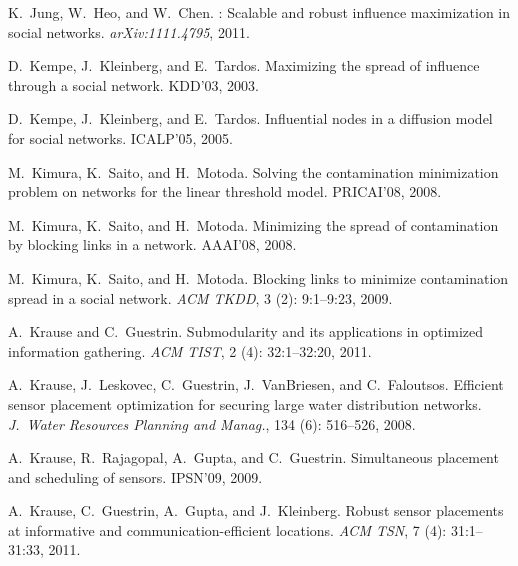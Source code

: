 \begin{thebibliography}{41}
K.~Jung, W.~Heo, and W.~Chen.
: Scalable and robust influence maximization in social
  networks.
\newblock \emph{arXiv:1111.4795}, 2011.

D.~Kempe, J.~Kleinberg, and E.~Tardos.
\newblock Maximizing the spread of influence through a social network.
\newblock KDD'03, 2003.

D.~Kempe, J.~Kleinberg, and E.~Tardos.
\newblock Influential nodes in a diffusion model for social networks.
\newblock ICALP'05, 2005.

M.~Kimura, K.~Saito, and H.~Motoda.
\newblock Solving the contamination minimization problem on networks for the
  linear threshold model.
\newblock PRICAI'08, 2008.

M.~Kimura, K.~Saito, and H.~Motoda.
\newblock Minimizing the spread of contamination by blocking links in a
  network.
\newblock AAAI'08, 2008.

M.~Kimura, K.~Saito, and H.~Motoda.
\newblock Blocking links to minimize contamination spread in a social network.
\newblock \emph{ACM TKDD}, 3 (2): 9:1--9:23, 2009.

A.~Krause and C.~Guestrin.
\newblock Submodularity and its applications in optimized information
  gathering.
\newblock \emph{ACM TIST}, 2 (4):
  32:1--32:20, 2011.

A.~Krause, J.~Leskovec, C.~Guestrin, J.~VanBriesen, and C.~Faloutsos.
\newblock Efficient sensor placement optimization for securing large water
  distribution networks.
\newblock \emph{J.~Water Resources Planning and Manag.},
  134 (6): 516--526, 2008.

A.~Krause, R.~Rajagopal, A.~Gupta, and C.~Guestrin.
\newblock Simultaneous placement and scheduling of sensors.
\newblock IPSN'09, 2009.

A.~Krause, C.~Guestrin, A.~Gupta, and J.~Kleinberg.
\newblock Robust sensor placements at informative and communication-efficient
  locations.
\newblock \emph{ACM TSN}, 7 (4): 31:1--31:33, 2011.


\end{thebibliography}
